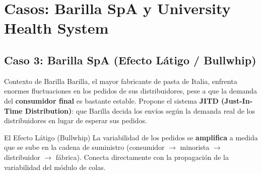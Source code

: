 \section{Casos: Barilla SpA y University Health System}

\subsection[Caso: Barilla SpA]{Caso 3: Barilla SpA (Efecto Látigo / Bullwhip)}

\begin{definicion}{Contexto de Barilla}
Barilla, el mayor fabricante de pasta de Italia, enfrenta enormes fluctuaciones en los pedidos de sus distribuidores, pese a que la demanda del \textbf{consumidor final} es bastante estable. Propone el sistema \textbf{JITD (Just-In-Time Distribution)}: que Barilla decida los envíos según la demanda real de los distribuidores en lugar de esperar sus pedidos.
\end{definicion}

\begin{definicion}{El Efecto Látigo (Bullwhip)}
La variabilidad de los pedidos se \textbf{amplifica} a medida que se sube en la cadena de suministro (consumidor $\to$ minorista $\to$ distribuidor $\to$ fábrica). Conecta directamente con la propagación de la variabilidad del módulo de colas.
\end{definicion}

